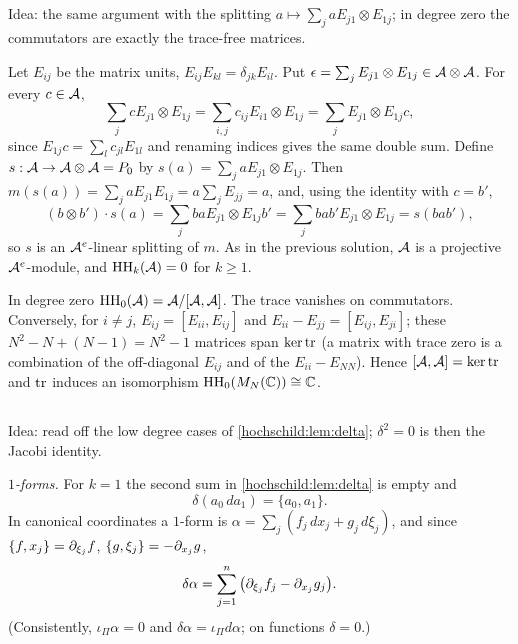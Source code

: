 \subsection*{}
Idea: the same argument with the splitting $a\mapsto\sum_jaE_{j1}\otimes E_{1j}$; in degree zero the
commutators are exactly the trace-free matrices.

Let $E_{ij}$ be the matrix units, $E_{ij}E_{kl}=\delta_{jk}E_{il}$. Put $\epsilon=\sum_jE_{j1}\otimes E_{1j}\in\mathcal{A}\otimes\mathcal{A}$.
For every $c\in\mathcal{A}$,
\begin{equation*}
  \sum_jcE_{j1}\otimes E_{1j}=\sum_{i,j}c_{ij}E_{i1}\otimes E_{1j}=\sum_jE_{j1}\otimes E_{1j}c,
\end{equation*}
since $E_{1j}c=\sum_lc_{jl}E_{1l}$ and renaming indices gives the same double sum. Define
$s:\mathcal{A}\to\mathcal{A}\otimes\mathcal{A}=P_0$ by $s(a)=\sum_jaE_{j1}\otimes E_{1j}$. Then
$m(s(a))=\sum_jaE_{j1}E_{1j}=a\sum_jE_{jj}=a$, and, using the identity with $c=b'$,
\begin{equation*}
  (b\otimes b')\cdot s(a)=\sum_jbaE_{j1}\otimes E_{1j}b'=\sum_jbab'E_{j1}\otimes E_{1j}=s(bab'),
\end{equation*}
so $s$ is an $\mathcal{A}^e$-linear splitting of $m$. As in the previous solution, $\mathcal{A}$ is a projective
$\mathcal{A}^e$-module, and $\operatorname{HH}_k(\mathcal{A})=0$ for $k\ge1$.

In degree zero $\operatorname{HH}_0(\mathcal{A})=\mathcal{A}/[\mathcal{A},\mathcal{A}]$. The trace vanishes on commutators. Conversely, for $i\ne j$,
$E_{ij}=[E_{ii},E_{ij}]$ and $E_{ii}-E_{jj}=[E_{ij},E_{ji}]$; these $N^2-N+(N-1)=N^2-1$ matrices span
$\ker\operatorname{tr}$ (a matrix with trace zero is a combination of the off-diagonal $E_{ij}$ and of the
$E_{ii}-E_{NN}$). Hence $[\mathcal{A},\mathcal{A}]=\ker\operatorname{tr}$ and $\operatorname{tr}$ induces an isomorphism $\operatorname{HH}_0(M_N(\mathbb{C}))\cong\mathbb{C}$.

\subsection*{}
Idea: read off the low degree cases of \cref{hochschild:lem:delta}; $\delta^2=0$ is then the Jacobi
identity.

\emph{$1$-forms.} For $k=1$ the second sum in \cref{hochschild:lem:delta} is empty and
\begin{equation*}
  \delta(a_0\,da_1)=\{a_0,a_1\}.
\end{equation*}
In canonical coordinates a $1$-form is $\alpha=\sum_j(f_j\,dx_j+g_j\,d\xi_j)$, and since
$\{f,x_j\}=\partial_{\xi_j}f$, $\{g,\xi_j\}=-\partial_{x_j}g$,
\begin{equation*}
  \delta\alpha=\sum_{j=1}^n\big(\partial_{\xi_j}f_j-\partial_{x_j}g_j\big).
\end{equation*}
(Consistently, $\iota_\Pi\alpha=0$ and $\delta\alpha=\iota_\Pi d\alpha$; on functions $\delta=0$.)

